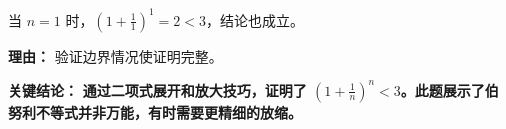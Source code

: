 \begin{examplebox}
\begin{description}[style=nextline, leftmargin=2.8em, labelsep=0.5em, itemsep=0.45em]
    \item[\textbf{第五步（补充说明）：}] 当 $n=1$ 时，$\left(1+\frac{1}{1}\right)^1 = 2 < 3$，结论也成立。
    \par\textbf{理由：} 验证边界情况使证明完整。
\end{description}

\textbf{\textcolor{CExample}{关键结论：}} \textbf{通过二项式展开和放大技巧，证明了 $\left(1+\frac{1}{n}\right)^n < 3$。此题展示了伯努利不等式并非万能，有时需要更精细的放缩。}
\end{examplebox}
